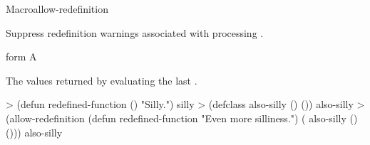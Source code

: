 \documentclass[10pt,twoside,english,pdftex]{article}
\begin{document}

\begin{functiondoc}{Macro}{allow-redefinition}{%
    \superstar{}
    \returns{} \superstar}
%
%

\fnsyntax 

\fnpurpose Suppress redefinition warnings associated with processing 
.

\fnpackage {}

\fnmodule {}

\fnargs
\begin{args}{form}
\arg[form] A 
\end{args}

\fnreturns The values returned by evaluating the last .

\fnexample
%
\W\supp
\begin{example}
> (defun redefined-function () "Silly.")
silly
> (defclass also-silly () ())
also-silly
> (allow-redefinition
     (defun redefined-function "Even more silliness.")
     ( also-silly () ()))
also-silly
\end{example}

\end{functiondoc}

\end{document}
